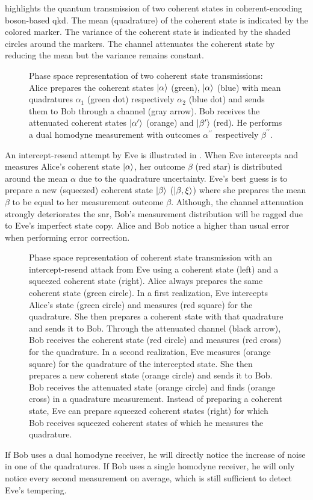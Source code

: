  highlights the quantum transmission of two coherent states in coherent-encoding boson-based \gls{qkd}.
The mean (quadrature) of the coherent state is indicated by the colored marker.
The variance of the coherent state is indicated by the shaded circles around the markers.
The channel attenuates the coherent state by reducing the mean but the variance remains constant.
\begin{figure}[htb]
	\centering
	
	\caption{Phase space representation of two coherent state transmissions: Alice prepares the coherent states $\ket{\alpha}$ (green), $\ket{\alpha}$ (blue) with mean quadratures $\alpha_1$ (green dot) respectively $\alpha_2$ (blue dot) and sends them to Bob through a channel (gray arrow). Bob receives the attenuated coherent states $\ket{\alpha^\prime}$ (orange) and $\ket{\beta^\prime}$ (red). He performs a dual homodyne measurement with outcomes $\alpha^{\prime\prime}$ respectively $\beta^{\prime\prime}$.}\label{fig:phase_space_coherent}
\end{figure}
An intercept-resend attempt by Eve is illustrated in .
When Eve intercepts and measures Alice's coherent state $\ket{\alpha}$, her outcome $\beta$ (red star) is distributed around the mean $\alpha$ due to the quadrature uncertainty.
Eve's best guess is to prepare a new (squeezed) coherent state $\ket{\beta}$ ($\ket{\beta,\xi}$) where she prepares the mean $\beta$ to be equal to her measurement outcome $\beta$.
Although, the channel attenuation strongly deteriorates the \gls{snr}, Bob's measurement distribution will be ragged due to Eve's imperfect state copy.
Alice and Bob notice a higher than usual error when performing error correction.
\begin{figure}[htb]
	\centering
	
	\caption{Phase space representation of coherent state transmission with an intercept-resend attack from Eve using a coherent state (left) and a squeezed coherent state (right). Alice always prepares the same coherent state (green circle). In a first realization, Eve intercepts Alice's state (green circle) and measures (red square) for the quadrature. She then prepares a coherent state with that quadrature and sends it to Bob. Through the attenuated channel (black arrow), Bob receives the coherent state (red circle) and measures (red cross) for the quadrature. In a second realization, Eve measures (orange square) for the quadrature of the intercepted state. She then prepares a new coherent state (orange circle) and sends it to Bob. Bob receives the attenuated state (orange circle) and finds (orange cross) in a quadrature measurement. Instead of preparing a coherent state, Eve can prepare squeezed coherent states (right) for which Bob receives squeezed coherent states of which he measures the quadrature.}\label{fig:phase_space_intercept_resend}
\end{figure}
If Bob uses a dual homodyne receiver, he will directly notice the increase of noise in one of the quadratures.
If Bob uses a single homodyne receiver, he will only notice every second measurement on average, which is still sufficient to detect Eve's tempering.